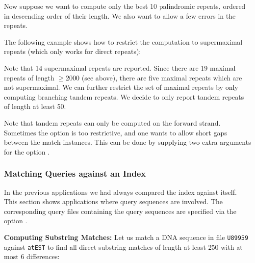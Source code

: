 \documentclass[12pt,titlepage]{article}
\makeatletter
\newcommand{\Seqfilename}[1]{\texttt{\small #1}\index{#1@\texttt{#1}}}
\newcommand{\EXECUTE}[1]{}
\makeatother
\begin{document}
\begin{AboutVmatch}
\EXECUTE{vmatch -seedlength 20 -exdrop 5 -evalue 10e-100 EcoliO157H7 | head -n 13}

Now suppose we want to compute only the best 10
palindromic repeats, ordered in descending order of their length.
We also want to allow a few errors in the repeats.

\EXECUTE{vmatch -p -l 1000 -best 10 -exdrop 1 -sort ld EcoliO157H7}

The following example
shows how to restrict the computation to supermaximal repeats
(which only works for direct repeats):

\EXECUTE{vmatch -supermax -l 2000 EcoliO157H7}

Note that 14 supermaximal repeats are reported. Since there
are 19 maximal repeats of length \(\geq 2000\) (see above), there are
five maximal repeats which are not supermaximal.
We can further restrict the set of maximal repeats by only 
computing branching tandem repeats. We decide to only report
tandem repeats of length at least 50.

\EXECUTE{vmatch -tandem -l 50 EcoliO157H7}

Note that tandem repeats can only be computed on the forward strand.
Sometimes the option  is too restrictive, and
one wants to allow short gaps between the match instances. This can
be done by supplying two extra arguments for the option
.

\EXECUTE{vmatch -l 50 10 30 EcoliO157H7}

\subsubsection{Matching Queries against an Index}\label{Substringmatching}
In the previous applications we had always compared the index
against itself. This section shows applications where 
query sequences are involved. The corresponding query files
containing the query sequences are specified via the option .

\textbf{Computing Substring Matches:}
Let us match a DNA sequence in file \Seqfilename{U89959} against 
\Seqfilename{atEST} to find all direct substring matches of length at 
least 250 with at most 6 differences:

\EXECUTE{vmatch -l 250 -e 6 -q U89959 -s 70 atEST}


\end{AboutVmatch}
\end{document}

